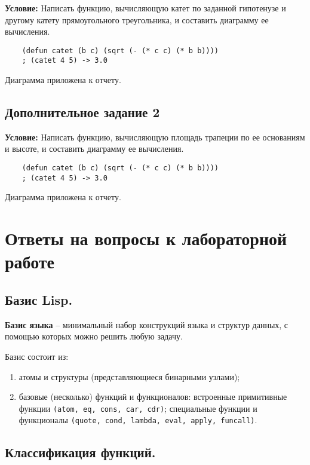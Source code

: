 \textbf{Условие:} Написать функцию, вычисляющую катет по заданной гипотенузе и другому катету прямоугольного треугольника, и составить диаграмму ее вычисления.

\begin{lstlisting}
	(defun catet (b c) (sqrt (- (* c c) (* b b))))
	; (catet 4 5) -> 3.0
\end{lstlisting}

Диаграмма приложена к отчету.


\section{Дополнительное задание 2}

\textbf{Условие:} Написать функцию, вычисляющую площадь трапеции по ее основаниям и высоте, и составить диаграмму ее вычисления.

\begin{lstlisting}
	(defun catet (b c) (sqrt (- (* c c) (* b b))))
	; (catet 4 5) -> 3.0
\end{lstlisting}

Диаграмма приложена к отчету.




\chapter{Ответы на вопросы к лабораторной работе}

\section{Базис Lisp.}

\textbf{Базис языка} -- минимальный набор конструкций языка и структур данных, с помощью которых можно решить любую задачу.

Базис состоит из:
\begin{enumerate}
    \item атомы и структуры (представляющиеся бинарными узлами);
    \item базовые (несколько) функций и функционалов: встроенные примитивные функции \texttt{(atom, eq, cons, car, cdr)}; специальные функции и функционалы \texttt{(quote, cond, lambda, eval, apply, funcall)}.
\end{enumerate}


\section{Классификация функций.}

